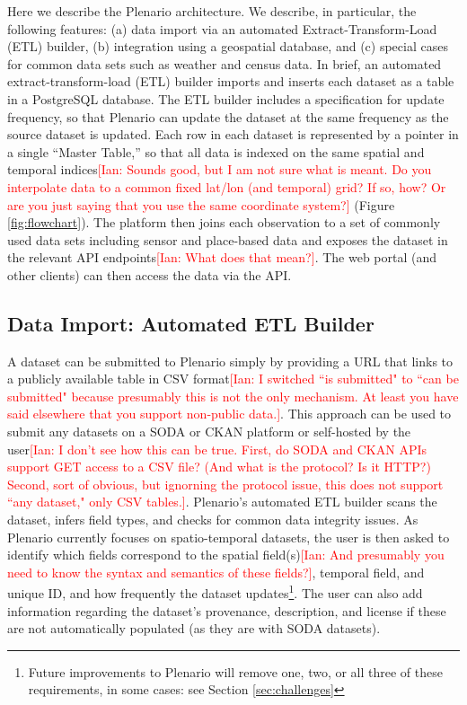 \documentclass[11pt]{article}
\newcommand{\ian}[1]{\textcolor{Red}{[Ian: #1]}}
\newcommand{\ian}[1]{}
\begin{document}
Here we describe the Plenario architecture. We describe, in particular, the following features: (a) data import via an automated Extract-Transform-Load (ETL) builder, (b) integration using a geospatial database, and (c) special cases for common data sets such as weather and census data. In brief, an automated extract-transform-load (ETL) builder imports and inserts each dataset as a table in a PostgreSQL database. The ETL builder includes a specification for update frequency, so that Plenario can update the dataset at the same frequency as the source dataset is updated. Each row in each dataset is represented by a pointer in a single ``Master Table,'' so that all data is indexed on the same spatial and temporal indices\ian{Sounds good, but I am not sure what is meant. Do you interpolate data to a common fixed lat/lon (and temporal) grid? If so, how? Or are you just saying that you use the same coordinate system?} (Figure \ref{fig:flowchart}). The platform then joins each observation to a set of commonly used data sets including sensor and place-based data and exposes the dataset in the relevant API endpoints\ian{What does that mean?}.  The web portal (and other clients) can then access the data via the API.

\subsection[data-import]{Data Import: \textbf{Automated ETL Builder}}
A dataset can be submitted to Plenario simply by providing a URL that links to a publicly available table in CSV format\ian{I switched ``is submitted" to ``can be submitted" because presumably this is not the only mechanism. At least you have said elsewhere that you support non-public data.}. This approach can be used to submit any datasets on a SODA or CKAN platform or self-hosted by the user\ian{I don't see how this can be true. First, do SODA and CKAN APIs support GET access to a CSV file? (And what is the protocol? Is it HTTP?) Second, sort of obvious, but ignorning the protocol issue, this does not support ``any dataset," only CSV tables.}. Plenario's automated ETL builder scans the dataset, infers field types, and checks for common data integrity issues. As Plenario currently focuses on spatio-temporal datasets, the user is then asked to identify which fields correspond to the spatial field(s)\ian{And presumably you need to know the syntax and semantics of these fields?}, temporal field, and unique ID, and how frequently the dataset updates\footnote{Future improvements to Plenario will remove one, two, or all three of these requirements, in some cases: see Section \ref{sec:challenges}}. The user can also add information regarding the dataset's provenance, description, and license if these are not automatically populated (as they are with SODA datasets). 
\end{document}
